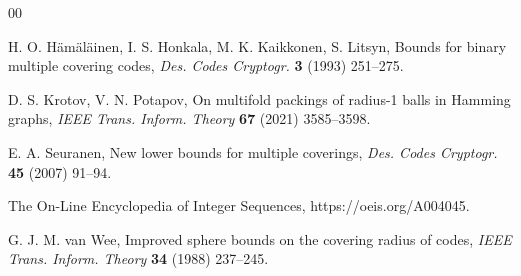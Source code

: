 \documentclass[10pt,a4paper]{article}
\begin{document}
\begin{thebibliography}{00}

 H. O. H\"am\"al\"ainen, I. S. Honkala, M. K. Kaikkonen, S. Litsyn, Bounds for binary multiple covering codes, {\it Des. Codes Cryptogr.} {\bf 3} (1993) 251--275.

 D. S. Krotov, V. N. Potapov, On multifold packings of radius-1 balls in Hamming graphs, {\it IEEE Trans. Inform. Theory} {\bf 67} (2021) 3585--3598.

 E. A. Seuranen, New lower bounds for multiple coverings, {\it Des. Codes Cryptogr.} {\bf 45} (2007) 91--94.

 The On-Line Encyclopedia of Integer Sequences, https://oeis.org/A004045.

 G. J. M. van Wee, Improved sphere bounds on the covering radius of codes, {\it IEEE Trans. Inform. Theory} {\bf 34} (1988) 237--245.

\end{thebibliography}
\end{document}
